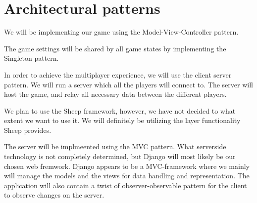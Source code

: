 \section{Architectural patterns}
\label{architecturalpatterns}

We will be implementing our game using the Model-View-Controller pattern.

The game settings will be shared by all game states by implementing the
Singleton pattern.

In order to achieve the multiplayer experience, we will use the client server
pattern. We will run a server which all the players will connect to. The server
will host the game, and relay all necessary data between the different players.

We plan to use the Sheep framework, however, we have not decided to what extent
we want to use it. We will definitely be utilizing the layer functionality
Sheep provides.

The server will be implmeented using the MVC pattern. What serverside
technology is not completely determined, but Django will most likely be our
chosen web fremwork. Django appears to be a MVC-framework where we mainly will
manage the models and the views for data handling and representation. The
application will also contain a twist of observer-observable pattern for the
client to observe changes on the server.
